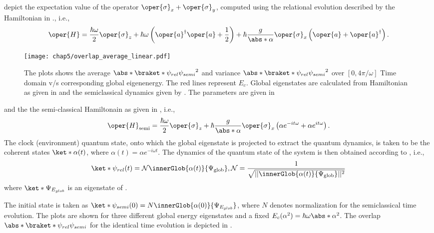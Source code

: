  depict the expectation value of the operator  \(\oper{\sigma}_x + \oper{\sigma}_y\), 
computed using the relational evolution described by the Hamiltonian in  ., i.e., 
\begin{eqnarray}
    \label{eq:chap5_JCM_Hamiltonian_linear}
    \oper{H} = \frac{\hbar \omega}{2} \oper{\sigma}_z + \hbar \omega \left(\oper{a}^\dagger \oper{a} + \frac{1}{2}\right) 
    + \hbar \frac{ g}{\abs*{\alpha}} \oper{\sigma}_x\left(\oper{a} + \oper{a}^\dagger\right).
\end{eqnarray}
\begin{figure}[!h]
    \centering
    \texttt{[image: chap5/overlap\_average\_linear.pdf]}
    \caption{
     The plots shows the average $\abs*{\braket*{\psi_{rel}}{\psi_{semi}}}^2$ and 
     variance $\abs*{\braket*{\psi_{rel}}{\psi_{semi}}}^2$ over \([0, 4\pi/\omega]\) Time domain v/s corresponding global eigenenergy. The red lines represent \(E_c\).
     Global eigenstates are calculated from Hamiltonian as given in  and the semiclassical dynamics given by . The parameters 
    are given in }
     \label{fig:chap5_linear_overlap_avg}
\end{figure}
and the the semi-classical Hamiltonain as given in , i.e., 
\begin{eqnarray}
\label{eq:chap5_semi_classical_JC_Linear}
    \oper{H}_{\text{semi}} = \frac{\hbar\omega}{2} \oper{\sigma}_z 
    + \hbar \frac{g}{\abs*{\alpha}} \oper{\sigma}_x\left( \alpha e^{-it\omega} + \alpha e^{it\omega} \right).
\end{eqnarray}
The clock (environment) quantum state, onto which the global eigenstate is projected
to extract the quantum dynamics, is taken to be
the coherent states \(\ket*{\alpha (t)}\), where \(\alpha(t) = \alpha e^{-i\omega t}\). The dynamics of the quantum state of the system is then obtained according to , i.e.,  
\begin{equation}
    \ket*{\psi_{rel}(t)} = \mathcal{N} \innerGlob{\alpha(t)}{\Psi_{\mathrm{glob}}},
    \mathcal{N} = \frac{1}{\sqrt{\lvert \lvert \innerGlob{\alpha(t)}{\Psi_{\mathrm{glob}}} \rvert \rvert^2}}
\end{equation}
where \(\ket*{\Psi_{E_{glob}}}\) is an eigenstate of . 

The initial state is taken as \(\ket*{\psi_{semi}(0)} = N\innerGlob{\alpha(0)}{\Psi_{E_{glob}}}\), where $N$ denotes normalization for the semiclassical time evolution. The plots are shown
for three different global energy eigenstates and a fixed \(E_c(\alpha^2) = \hbar \omega \abs*{\alpha}^2\). The overlap \(\abs*{\braket*{\psi_{rel}}{\psi_{semi}}}\) for the identical time evolution is depicted in .


